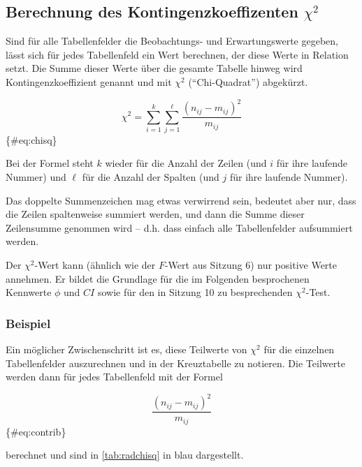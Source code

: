 \documentclass[
  ngerman,
]{article}
\begin{document}
\hypertarget{berechnung-des-kontingenzkoeffizenten-chi2}{%
\subsection{\texorpdfstring{Berechnung des Kontingenzkoeffizenten \(\chi^2\)}{Berechnung des Kontingenzkoeffizenten \textbackslash chi\^{}2}}\label{berechnung-des-kontingenzkoeffizenten-chi2}}

Sind für alle Tabellenfelder die Beobachtungs- und Erwartungswerte gegeben, lässt sich für jedes Tabellenfeld ein Wert berechnen, der diese Werte in Relation setzt. Die Summe dieser Werte über die gesamte Tabelle hinweg wird Kontingenzkoeffizient genannt und mit \(\chi^2\) (``Chi-Quadrat'') abgekürzt.

\nopagebreak

\[
\chi^2= \sum_{i=1}^{k}\sum_{j=1}^{\ell}\frac{(n_{ij}-m_{ij})^{2}}{m_{ij}}
\]\{\#eq:chisq\}

Bei der Formel steht \(k\) wieder für die Anzahl der Zeilen (und \(i\) für ihre laufende Nummer) und \(\ell\) für die Anzahl der Spalten (und \(j\) für ihre laufende Nummer).

Das doppelte Summenzeichen mag etwas verwirrend sein, bedeutet aber nur, dass die Zeilen spaltenweise summiert werden, und dann die Summe dieser Zeilensumme genommen wird -- d.h. dass einfach alle Tabellenfelder aufsummiert werden.

Der \(\chi^2\)-Wert kann (ähnlich wie der \(F\)-Wert aus Sitzung 6) nur positive Werte annehmen. Er bildet die Grundlage für die im Folgenden besprochenen Kennwerte \(\phi\) und \(\mathit{CI}\) sowie für den in Sitzung 10 zu besprechenden \(\chi^2\)-Test.

\hypertarget{beispiel-32}{%
\subsubsection{Beispiel}\label{beispiel-32}}

Ein möglicher Zwischenschritt ist es, diese Teilwerte von \(\chi^2\) für die einzelnen Tabellenfelder auszurechnen und in der Kreuztabelle zu notieren. Die Teilwerte werden dann für jedes Tabellenfeld mit der Formel

\nopagebreak

\[
\frac{(n_{ij}-m_{ij})^{2}}{m_{ij}}
\]\{\#eq:contrib\}

berechnet und sind in \autoref{tab:radchisq} in blau dargestellt.
\end{document}

